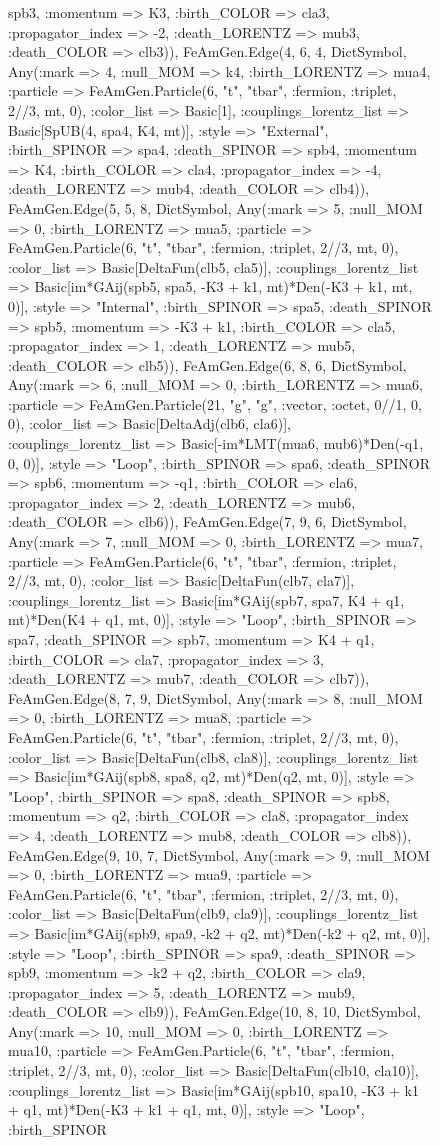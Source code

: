 \documentclass{revtex4}
\begin{document}
\begin{figure}[!htb]
\begin{center}
{spb3, :momentum => K3, :birth_COLOR => cla3, :propagator_index => -2, :death_LORENTZ => mub3, :death_COLOR => clb3)), FeAmGen.Edge(4, 6, 4, Dict{Symbol, Any}(:mark => 4, :null_MOM => k4, :birth_LORENTZ => mua4, :particle => FeAmGen.Particle(6, "t", "tbar", :fermion, :triplet, 2//3, mt, 0), :color_list => Basic[1], :couplings_lorentz_list => Basic[SpUB(4, spa4, K4, mt)], :style => "External", :birth_SPINOR => spa4, :death_SPINOR => spb4, :momentum => K4, :birth_COLOR => cla4, :propagator_index => -4, :death_LORENTZ => mub4, :death_COLOR => clb4)), FeAmGen.Edge(5, 5, 8, Dict{Symbol, Any}(:mark => 5, :null_MOM => 0, :birth_LORENTZ => mua5, :particle => FeAmGen.Particle(6, "t", "tbar", :fermion, :triplet, 2//3, mt, 0), :color_list => Basic[DeltaFun(clb5, cla5)], :couplings_lorentz_list => Basic[im*GAij(spb5, spa5, -K3 + k1, mt)*Den(-K3 + k1, mt, 0)], :style => "Internal", :birth_SPINOR => spa5, :death_SPINOR => spb5, :momentum => -K3 + k1, :birth_COLOR => cla5, :propagator_index => 1, :death_LORENTZ => mub5, :death_COLOR => clb5)), FeAmGen.Edge(6, 8, 6, Dict{Symbol, Any}(:mark => 6, :null_MOM => 0, :birth_LORENTZ => mua6, :particle => FeAmGen.Particle(21, "g", "g", :vector, :octet, 0//1, 0, 0), :color_list => Basic[DeltaAdj(clb6, cla6)], :couplings_lorentz_list => Basic[-im*LMT(mua6, mub6)*Den(-q1, 0, 0)], :style => "Loop", :birth_SPINOR => spa6, :death_SPINOR => spb6, :momentum => -q1, :birth_COLOR => cla6, :propagator_index => 2, :death_LORENTZ => mub6, :death_COLOR => clb6)), FeAmGen.Edge(7, 9, 6, Dict{Symbol, Any}(:mark => 7, :null_MOM => 0, :birth_LORENTZ => mua7, :particle => FeAmGen.Particle(6, "t", "tbar", :fermion, :triplet, 2//3, mt, 0), :color_list => Basic[DeltaFun(clb7, cla7)], :couplings_lorentz_list => Basic[im*GAij(spb7, spa7, K4 + q1, mt)*Den(K4 + q1, mt, 0)], :style => "Loop", :birth_SPINOR => spa7, :death_SPINOR => spb7, :momentum => K4 + q1, :birth_COLOR => cla7, :propagator_index => 3, :death_LORENTZ => mub7, :death_COLOR => clb7)), FeAmGen.Edge(8, 7, 9, Dict{Symbol, Any}(:mark => 8, :null_MOM => 0, :birth_LORENTZ => mua8, :particle => FeAmGen.Particle(6, "t", "tbar", :fermion, :triplet, 2//3, mt, 0), :color_list => Basic[DeltaFun(clb8, cla8)], :couplings_lorentz_list => Basic[im*GAij(spb8, spa8, q2, mt)*Den(q2, mt, 0)], :style => "Loop", :birth_SPINOR => spa8, :death_SPINOR => spb8, :momentum => q2, :birth_COLOR => cla8, :propagator_index => 4, :death_LORENTZ => mub8, :death_COLOR => clb8)), FeAmGen.Edge(9, 10, 7, Dict{Symbol, Any}(:mark => 9, :null_MOM => 0, :birth_LORENTZ => mua9, :particle => FeAmGen.Particle(6, "t", "tbar", :fermion, :triplet, 2//3, mt, 0), :color_list => Basic[DeltaFun(clb9, cla9)], :couplings_lorentz_list => Basic[im*GAij(spb9, spa9, -k2 + q2, mt)*Den(-k2 + q2, mt, 0)], :style => "Loop", :birth_SPINOR => spa9, :death_SPINOR => spb9, :momentum => -k2 + q2, :birth_COLOR => cla9, :propagator_index => 5, :death_LORENTZ => mub9, :death_COLOR => clb9)), FeAmGen.Edge(10, 8, 10, Dict{Symbol, Any}(:mark => 10, :null_MOM => 0, :birth_LORENTZ => mua10, :particle => FeAmGen.Particle(6, "t", "tbar", :fermion, :triplet, 2//3, mt, 0), :color_list => Basic[DeltaFun(clb10, cla10)], :couplings_lorentz_list => Basic[im*GAij(spb10, spa10, -K3 + k1 + q1, mt)*Den(-K3 + k1 + q1, mt, 0)], :style => "Loop", :birth_SPINOR }
\end{center}
\end{figure}
\end{document}
